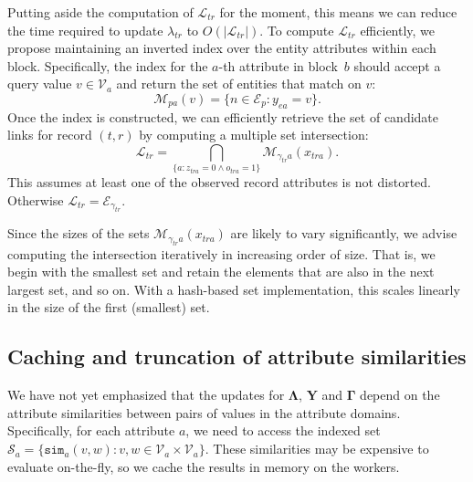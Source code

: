 \documentclass[12pt,letterpaper]{article}
\renewcommand\vec{\bm}
\newcommand{\simfn}{\mathtt{sim}} %
\newcommand{\valset}{\mathcal{V}} %
\newcommand{\partset}{\mathcal{E}} %
\newcommand{\1}[1]{\mathbb{I}\!\left[#1\right]} %
\begin{document}
Putting aside the computation of $\mathcal{L}_{tr}$ for the moment, 
this means we can reduce the time required to update 
$\lambda_{tr}$ to $O(|\mathcal{L}_{tr}|)$.
To compute $\mathcal{L}_{tr}$ efficiently, we propose maintaining 
an inverted index over the entity attributes within each block.
Specifically, the index for the $a$-th attribute in 
block~$b$ should accept a query value $v \in \valset_{a}$ 
and return the set of entities that match on $v$:
\begin{equation}
\mathcal{M}_{pa}(v) = \{n \in \partset_{p}: y_{ea} = v\}.
\end{equation}
Once the index is constructed, we can efficiently retrieve the 
set of candidate links for record $(t,r)$ by computing a 
multiple set intersection:
\begin{equation}
\mathcal{L}_{tr} = \bigcap_{\{a : z_{tra} = 0 \wedge o_{tra} = 1\}}
\mathcal{M}_{\gamma_{tr}a}(x_{tra}).
\label{eqn:set-intersection}
\end{equation}
This assumes at least one of the observed record attributes 
is not distorted. 
Otherwise $\mathcal{L}_{tr} = \partset_{\gamma_{tr}}$.

Since the sizes of the sets $\mathcal{M}_{\gamma_{tr}a}(x_{tra})$ 
are likely to vary significantly, we advise computing 
the intersection iteratively in increasing order of size.
That is, we begin with the smallest set and retain the elements 
that are also in the next largest set, and so on.
With a hash-based set implementation, this scales linearly 
in the size of the first (smallest) set.

\subsection{Caching and truncation of attribute similarities}
\label{sec:trunc-sim}
We have not yet emphasized that the updates for $\vec{\Lambda}$, 
$\vec{Y}$ and $\vec{\Gamma}$ depend on the attribute 
similarities between pairs of values in the attribute domains.
Specifically, for each attribute $a$, we need to access 
the indexed set $\mathcal{S}_{a} = 
  \{\simfn_{a}(v,w): v, w \in \valset_{a} \times \valset_{a} \}$.
These similarities may be expensive to evaluate on-the-fly, 
so we cache the results in memory on the workers.
\end{document}
